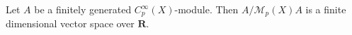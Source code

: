 Let $A$ be a finitely generated $C_p^\infty(X)$-module. Then $A / \mathcal{M}_p(X)A$ is a finite dimensional vector space over $\mathbf{R}$.
